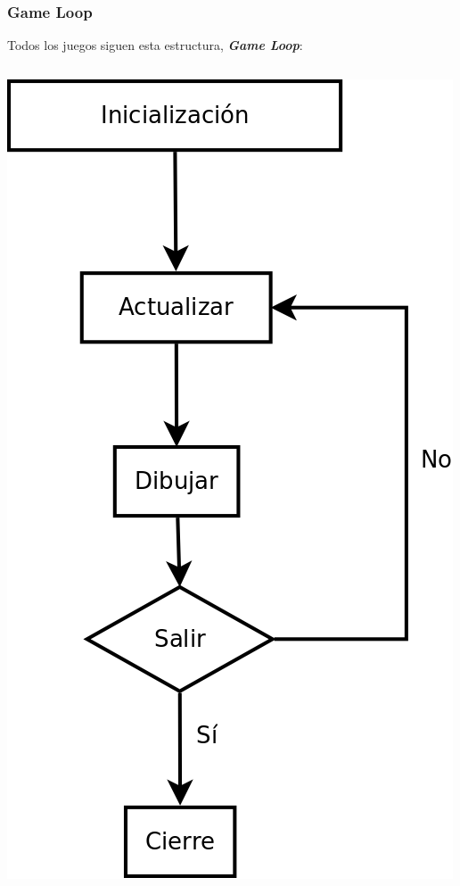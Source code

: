 \begin{frame}
	\frametitle{Game Loop}
	
	\begin{center}
		Todos los juegos siguen esta estructura, \textbf{\emph{Game Loop}}:
	\end{center}	
	
	\begin{columns}
	
	\column{150pt}
	\begin{center}
		\includegraphics[scale=0.25]{img/gameloop.png}
	\end{center}	
	

\end{columns}
\end{frame}
